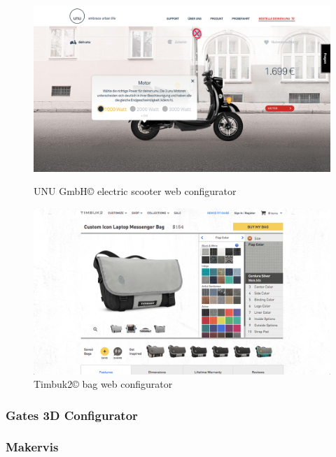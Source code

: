 \documentclass[Medieninformatik-arbeit.tex]{subfiles}
\begin{document}
\begin{figure}[h]
\begin{minipage}{.45\textwidth}
  \includegraphics[width=\linewidth]{RelatedWork/img/unu-config}
  \caption{UNU GmbH\copyright{} electric scooter web configurator\cite{unu:2015:Online}}
\label{fig:unu-config}
\end{minipage}
\begin{minipage}{.45\textwidth}
  \includegraphics[width=\linewidth]{RelatedWork/img/timbuk2-config}
  \caption{Timbuk2\copyright{} bag web configurator\cite{timbuk2:2015:Online}}
\label{fig:timbuk2-config}
\end{minipage}
\end{figure}

\subsubsection{Gates 3D Configurator}

\subsubsection{Makervis}
\end{document}
